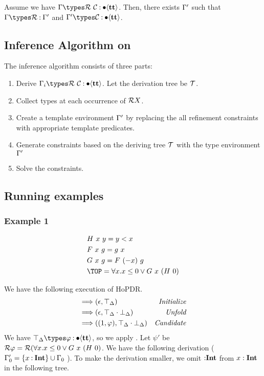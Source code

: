 \documentclass[acmsmall,review,anonymous]{acmart}\settopmatter{printfolios=true,printccs=false,printacmref=false}
\begin{document}
\begin{lemma}
Assume we have \( \tenv \types \RULES\ \cex \COL \tb{\true} \).
Then, there exists \( \Gamma' \) such that
\( \tenv \types \RULES \COL \tenv' \) and \( \tenv' \types \cex \COL \tb{\true} \).
\end{lemma}

\subsection{Inference Algorithm on \rconflict{}}

The inference algorithm consists of three parts:
\begin{enumerate}
\item Derive \( \tenv_i \types \RULES\ \cex \COL \tb{\true} \). Let the derivation tree be \( \mathcal{T} \).
\item Collect types at each occurrence of \( \mathcal{R} X \).
\item Create a template environment \( \Gamma' \) by replacing the all refinement constraints with appropriate template predicates.
\item Generate constraints based on the deriving tree \( \mathcal{T} \) with the type environment \( \Gamma' \)
\item Solve the constraints.
\end{enumerate}

\subsection{Running examples}

\subsubsection{Example 1}

\begin{align*}
    &H\ x\ y = y < x \\
    &F\ x\ g = g\ x \\
    &G\ x\ g = F\ (-x)\ g  \\
    &\TOP = \forall x. x\leq 0 \vee G\ x\ (H\ 0)
\end{align*}

We have the following execution of HoPDR.
\begin{align*}
    &\Longrightarrow (\epsilon, \top_{\Delta}) &\emph{Initialize}\\
    &\Longrightarrow (\epsilon, \top_{\Delta} \cdot \bot_{\Delta}) &\emph{Unfold}\\
    &\Longrightarrow ((1, \varphi), \top_{\Delta} \cdot \bot_{\Delta}) &\emph{Candidate}\\
\end{align*}
We have \( \TE{\stE} \types \pdrtop \COL \tb{\true} \), so we apply \rconflict{}. Let \( \psi' \) be \( \mathcal{R} \varphi = \mathcal{R} (\forall x. x \leq 0 \lor G\ x\ (H\ 0) \).
We have the following derivation
( \( \Gamma_0' = \{x \mathbin{:} \textbf{Int}\} \cup \Gamma_0 \) ).
To make the derivation smaller, we omit \( \mathbin{:} \textbf{Int} \) from \( {x} : \textbf{Int} \) in the following tree.
\end{document}
